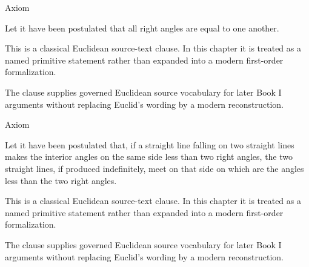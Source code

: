 \begin{lra-not-visible}
\NoLocalDependencies
\end{lra-not-visible}

\begin{axiombox}{Axiom}
\begin{axiom}
\label{ax:euclid-postulate-right-angles-equal}
Let it have been postulated that all right angles are equal to one another.
\end{axiom}
\end{axiombox}
\begin{remark*}
This is a classical Euclidean source-text clause. In this chapter it is treated
as a named primitive statement rather than expanded into a modern first-order
formalization.
\end{remark*}

\begin{remark*}[Interpretation]
The clause supplies governed Euclidean source vocabulary for later Book I
arguments without replacing Euclid's wording by a modern reconstruction.
\end{remark*}

\begin{lra-not-visible}
\NoLocalDependencies
\end{lra-not-visible}

\begin{axiombox}{Axiom}
\begin{axiom}
\label{ax:euclid-postulate-parallel}
Let it have been postulated that, if a straight line falling on two straight
lines makes the interior angles on the same side less than two right angles,
the two straight lines, if produced indefinitely, meet on that side on which are
the angles less than the two right angles.
\end{axiom}
\end{axiombox}
\begin{remark*}
This is a classical Euclidean source-text clause. In this chapter it is treated
as a named primitive statement rather than expanded into a modern first-order
formalization.
\end{remark*}

\begin{remark*}[Interpretation]
The clause supplies governed Euclidean source vocabulary for later Book I
arguments without replacing Euclid's wording by a modern reconstruction.
\end{remark*}

\begin{lra-not-visible}
\NoLocalDependencies
\end{lra-not-visible}
